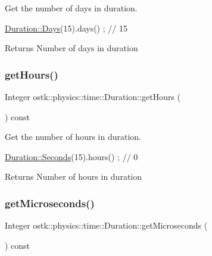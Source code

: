 Get the number of days in duration. 


\begin{DoxyCode}
\hyperlink{classostk_1_1physics_1_1time_1_1_duration_aefb4abc87c6957d00650228d069fa1e1}{Duration::Days}(15).days() ; \textcolor{comment}{// 15}
\end{DoxyCode}


\begin{DoxyReturn}{Returns}
Number of days in duration 
\end{DoxyReturn}
\mbox{\label{classostk_1_1physics_1_1time_1_1_duration_ac33d36a6a043ad71b0203b02b9ff961b}} 
\subsubsection{\texorpdfstring{get\+Hours()}{getHours()}}
{\footnotesize\ttfamily Integer ostk\+::physics\+::time\+::\+Duration\+::get\+Hours (\begin{DoxyParamCaption}{ }\end{DoxyParamCaption}) const}



Get the number of hours in duration. 


\begin{DoxyCode}
\hyperlink{classostk_1_1physics_1_1time_1_1_duration_ad973fa34fcc308fdcc8d50c3ee694764}{Duration::Seconds}(15).hours() ; \textcolor{comment}{// 0}
\end{DoxyCode}


\begin{DoxyReturn}{Returns}
Number of hours in duration 
\end{DoxyReturn}
\mbox{\label{classostk_1_1physics_1_1time_1_1_duration_a022d05824638f8288e84131d6b5e07be}} 
\subsubsection{\texorpdfstring{get\+Microseconds()}{getMicroseconds()}}
{\footnotesize\ttfamily Integer ostk\+::physics\+::time\+::\+Duration\+::get\+Microseconds (\begin{DoxyParamCaption}{ }\end{DoxyParamCaption}) const}



